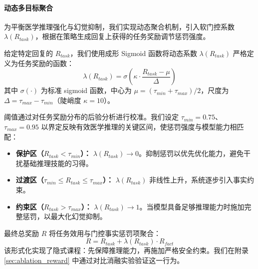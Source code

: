 \paragraph{动态多目标聚合}

为平衡医学推理强化与幻觉抑制，我们实现动态聚合机制，引入软门控系数 $\lambda(R_{task})$，根据在策略生成回复上获得的任务奖励调节惩罚强度。

给定特定回复的 $R_{task}$，我们使用成形 Sigmoid 函数将动态系数 $\lambda(R_{task})$ 严格定义为任务奖励的函数：
\begin{equation}
\lambda(R_{task}) = \sigma \left( \kappa \cdot \frac{R_{task} - \mu}{\Delta} \right)
\end{equation}
其中 $\sigma(\cdot)$ 为标准 sigmoid 函数，中心为 $\mu = (\tau_{min} + \tau_{max})/2$，尺度为 $\Delta = \tau_{max} - \tau_{min}$（陡峭度 $\kappa=10$）。

阈值通过对任务奖励分布的后验分析进行校准。我们设定 $\tau_{min} = 0.75$、$\tau_{max} = 0.95$ 以界定反映有效医学推理的关键区间，使惩罚强度与模型能力相匹配：

\begin{itemize}
    \item \textbf{保护区（$R_{task} < \tau_{min}$）：} $\lambda(R_{task}) \to 0$。抑制惩罚以优先优化能力，避免干扰基础推理技能的习得。
    \item \textbf{过渡区（$\tau_{min} \le R_{task} \le \tau_{max}$）：} $\lambda(R_{task})$ 非线性上升，系统逐步引入事实约束。
    \item \textbf{约束区（$R_{task} > \tau_{max}$）：} $\lambda(R_{task}) \to 1$。当模型具备足够推理能力时施加完整惩罚，以最大化幻觉抑制。
\end{itemize}

最终总奖励 $R$ 将任务效用与门控事实惩罚项聚合：
\begin{equation}
R = R_{task} + \lambda(R_{task}) \cdot R_{fact}
\label{eq:full-fact-aware-rl}
\end{equation}
该形式化实现了隐式课程：先保障推理能力，再施加严格安全约束。我们在附录 \ref{sec:ablation_reward} 中通过对比消融实验验证这一行为。


















